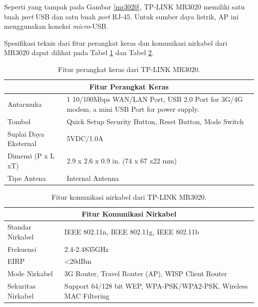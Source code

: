     Seperti yang tampak pada Gambar \ref{mr3020}, TP-LINK MR3020 memiliki satu buah \emph{port} USB dan satu buah \emph{port} RJ-45. Untuk sumber daya listrik, AP ini menggunakan koneksi \emph{micro}-USB.

    Spesifikasi teknis dari fitur perangkat keras dan komunikasi nirkabel dari MR3020 dapat dilihat pada Tabel \ref{mr3020-hardware-feature} dan Tabel \ref{mr3020-wireless-feature}.

    \begin{table}[H]
    \centering
    \caption{Fitur perangkat keras dari TP-LINK MR3020.}
    \label{mr3020-hardware-feature}
    \begin{tabular}{|l|p{10cm}|}
    \hline
    \multicolumn{2}{|c|}{Fitur Perangkat Keras}                                                                                                \\ \hline
    Antarmuka             & 1 10/100Mbps WAN/LAN Port, USB 2.0 Port for 3G/4G modem, a mini USB Port for power supply.   \\ \hline
    Tombol                & Quick Setup Security Button, Reset Button, Mode Switch                                                             \\ \hline
    Suplai Daya Eksternal & 5VDC/1.0A                                                                                                          \\ \hline
    Dimensi (P x L xT)    & 2.9 x 2.6 x 0.9 in. (74 x 67 x22 mm)                                                                               \\ \hline
    Tipe Antena           & Internal Antenna                                                                                                   \\ \hline
    \end{tabular}
    \end{table}

    \begin{table}[H]
    \centering
    \caption{Fitur komunikasi nirkabel dari TP-LINK MR3020.}
    \label{mr3020-wireless-feature}
    \begin{tabular}{|l|p{10cm}|}
    \hline
    \multicolumn{2}{|c|}{Fitur Komunikasi Nirkabel}                                         \\ \hline
    Standar Nirkabel   & IEEE 802.11n, IEEE 802.11g, IEEE 802.11b                           \\ \hline
    Frekuensi          & 2.4-2.4835GHz                                                      \\ \hline
    EIRP               & <20dBm                                                             \\ \hline
    Mode Nirkabel      & 3G Router, Travel Router (AP), WISP Client Router                  \\ \hline
    Sekuritas Nirkabel & Support 64/128 bit WEP, WPA-PSK/WPA2-PSK, Wireless MAC Filtering   \\ \hline
    \end{tabular}
    \end{table}
